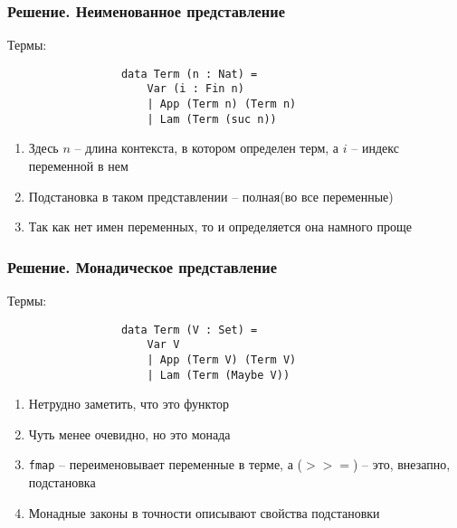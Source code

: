 \documentclass{beamer}
\begin{document}
\begin{frame}[fragile=singleslide]\frametitle{Решение. Неименованное представление}
    Термы:
    \begin{figure}[H]
            \center
            \begin{verbatim}
            data Term (n : Nat) =
                Var (i : Fin n)
                | App (Term n) (Term n)
                | Lam (Term (suc n))
            \end{verbatim}
        \end{figure}
    \begin{enumerate}
        \item Здесь $n$ -- длина контекста, в котором определен терм, а $i$ -- индекс переменной в нем
        \item Подстановка в таком представлении -- полная(во все переменные)
        \item Так как нет имен переменных, то и определяется она намного проще
    \end{enumerate}
\end{frame}


\begin{frame}[fragile=singleslide]\frametitle{Решение. Монадическое представление}
    Термы:
    \begin{figure}[H]
            \center
            \begin{verbatim}
            data Term (V : Set) =
                Var V
                | App (Term V) (Term V)
                | Lam (Term (Maybe V))
            \end{verbatim}
        \end{figure}
    \begin{enumerate}
        \item Нетрудно заметить, что это функтор
        \item Чуть менее очевидно, но это монада
        \item \texttt{fmap} -- переименовывает переменные в терме, а ($>>=$) -- это, внезапно, подстановка
        \item Монадные законы в точности описывают свойства подстановки
    \end{enumerate}
\end{frame}
\end{document}
